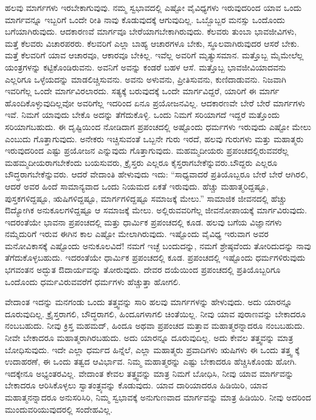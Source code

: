 ಹಲವು ಮಾರ್ಗಗಳು ಇರಬೇಕಾಗುವುವು. ನಮ್ಮ ಸ್ವಭಾವದಲ್ಲಿ ಎಷ್ಟೋ ವೈವಿಧ್ಯಗಳು ಇರುವುದರಿಂದ ಯಾವ ಒಂದು ಮಾರ್ಗವನ್ನೂ ಇಬ್ಬರಿಗೆ ಒಂದೇ ರೀತಿ ನಾವು ಕೊಡುವುದಕ್ಕೆ ಆಗುವುದಿಲ್ಲ. ಒಬ್ಬೊಬ್ಬರ ಮನಸ್ಸು ಒಂದೊಂದು ಬಗೆಯಾಗಿರುವುದು. ಆದಕಾರಣವೆ ಮಾರ್ಗವೂ ಬೇರೆಯಾಗಬೇಕಾಗಿರುವುದು. ಕೆಲವರು ತುಂಬಾ ಭಾವಜೀವಿಗಳು, ಮತ್ತೆ ಕೆಲವರು ವಿಚಾರಪರರು. ಕೆಲವರಿಗೆ ಎಲ್ಲಾ ಬಾಹ್ಯ ಆಚಾರಗಳೂ ಬೇಕು, ಸ್ಥೂಲವಾಗಿರುವುದರ ಆಸರೆ ಬೇಕು. ಮತ್ತೆ ಕೆಲವರಿಗೆ ಯಾವ ಆಚಾರವೂ, ಆಕಾರವೂ ಬೇಕಿಲ್ಲ. ಇವೆಲ್ಲ ಅವರಿಗೆ ಮೃತ್ಯುಸಮಾನ. ಮತ್ತೊಬ್ಬ ಮೈಮೇಲೆಲ್ಲ ಯಂತ್ರಗಳನ್ನು ಕಟ್ಟಿಕೊಂಡಿರುವನು. ಅವನಿಗೆ ಅವನ್ನು ಕಂಡರೆ ಬಹಳ ಆಸೆ. ಮತ್ತೊಬ್ಬ ಭಾವಜೀವಿಯಾದವನು ಎಲ್ಲರಿಗೂ ಒಳ್ಳೆಯದನ್ನು ಮಾಡಲಿಚ್ಚಿಸುವನು. ಅವನು ಅಳುವನು, ಪ್ರೀತಿಸುವನು, ಕುಣಿದಾಡುವನು. ನಿಜವಾಗಿ ಇವರಿಗೆಲ್ಲ ಒಂದೇ ಮಾರ್ಗವಿರಲಾರದು. ಸತ್ಯಕ್ಕೆ ಬರುವುದಕ್ಕೆ ಒಂದೇ ಮಾರ್ಗವಿದ್ದರೆ, ಯಾರಿಗೆ ಈ ಮಾರ್ಗ ಹೊಂದಿಕೊಳ್ಳುವುದಿಲ್ಲವೋ ಅವರಿಗೆಲ್ಲ ಇದರಿಂದ ಏನೂ ಪ್ರಯೋಜನವಿಲ್ಲ. ಆದಕಾರಣವೇ ಬೇರೆ ಬೇರೆ ಮಾರ್ಗಗಳು ಇವೆ. ನಿಮಗೆ ಯಾವುದು ಬೇಕೊ ಅದನ್ನು ತೆಗೆದುಕೊಳ್ಳಿ. ಒಂದು ನಿಮಗೆ ಸರಿಯಾಗದೆ ಇದ್ದರೆ ಮತ್ತೊಂದು ಸರಿಯಾಗಬಹುದು. ಈ ದೃಷ್ಟಿಯಿಂದ ನೋಡಿದಾಗ ಪ್ರಪಂಚದಲ್ಲಿ ಅಷ್ಟೊಂದು ಧರ್ಮಗಳು ಇರುವುದು ಎಷ್ಟೋ ಮೇಲು ಎಂಬುದು ಗೊತ್ತಾಗುವುದು. ಅನೇಕರು ಇಚ್ಚಿಸುವಂತೆ ಒಬ್ಬನೇ ಗುರು ಇರದೆ, ಹಲವು ಗುರುಗಳು ಮತ್ತು ಮಹಾತ್ಮರು ಇರುವುದರಿಂದ ಎಷ್ಟು ಪ್ರಯೋಜನ ಎನ್ನುವುದು ಗೊತ್ತಾಗುವುದು. ಮಹಮ್ಮದೀಯರು ಪ್ರಪಂಚದಲ್ಲಿರುವವರೆಲ್ಲ ಮಹಮ್ಮದೀಯರಾಗಬೇಕೆಂದು ಬಯಸುವರು, ಕ್ರೈಸ್ತರು ಎಲ್ಲರೂ ಕೈಸ್ತರಾಗಬೇಕೆನ್ನುವರು.\break ಬೌದ್ದರು ಎಲ್ಲರೂ ಬೌದ್ಧರಾಗಬೇಕೆನ್ನುವರು. ಆದರೆ ವೇದಾಂತಿ ಹೇಳುವುದು ಇದು: “ಸಾಧ್ಯವಾದರೆ ಪ್ರತಿಯೊಬ್ಬರೂ ಬೇರೆ ಬೇರೆ ಆಗಿರಲಿ, ಆದರೆ ಅವರ ಹಿಂದೆ ಸಾಮಾನ್ಯವಾದ ಒಂದು ನಿಯಮದ ಏಕತೆ ಇರುವುದು. ಹೆಚ್ಚು ಮಹಾತ್ಮರಿದ್ದಷ್ಟೂ, ಪುಸ್ತಕಗಳಿದ್ದಷ್ಟೂ, ಋಷಿಗಳಿದ್ದಷ್ಟೂ, ಮಾರ್ಗಗಳಿದ್ದಷ್ಟೂ ಸಮಾಜಕ್ಕೆ ಮೇಲು.” ಸಾಮಾಜಿಕ ಜೀವನದಲ್ಲಿ ಹೆಚ್ಚು ಔದ್ಯೋಗಿಕ ಅನುಕೂಲಗಳಿದ್ದಷ್ಟೂ ಆ ಸಮಾಜಕ್ಕೆ ಮೇಲು. ಅಲ್ಲಿರುವವರಿಗೆಲ್ಲ ಜೀವನೋಪಾಯಕ್ಕೆ ಮಾರ್ಗವಿರುವುದು. ಇದರಂತೆಯೇ ಭಾವನಾ ಪ್ರಪಂಚದಲ್ಲಿ ಮತ್ತು ಧಾರ್ಮಿಕ ಪ್ರಪಂಚದಲ್ಲಿ ಕೂಡ. ಹಲವು ಬಗೆಯ ವಿಜ್ಞಾನಗಳು ನಮ್ಮೆದುರಿಗೆ ಇರುವ ಈಗಿನ ಕಾಲ ಎಷ್ಟೋ ಮೇಲಾಗಿರುವುದು. ಇಷ್ಟೊಂದು ವೈವಿಧ್ಯ ಇರುವಾಗ ಅವರ ಮನೋವಿಕಾಸಕ್ಕೆ ಎಷ್ಟೊಂದು ಅನುಕೂಲವಿದೆ! ನಮಗೆ ಇಚ್ಛೆ ಬಂದುದನ್ನು, ನಮಗೆ ಶ್ರೇಷ್ಠವೆಂದು ತೋರಿದುದನ್ನು ನಾವು ತೆಗೆದುಕೊಳ್ಳಬಹುದು. ಇದರಂತೆಯೇ ಧಾರ್ಮಿಕ ಪ್ರಪಂಚದಲ್ಲಿ ಕೂಡ. ಪ್ರಪಂಚದಲ್ಲಿ ಇಷ್ಟೊಂದು ಧರ್ಮಗಳಿರುವುದು ಭಗವಂತನ ಅದ್ಭುತ ಔದಾರ್ಯವನ್ನು ತೋರುವುದು. ದೇವರ ದಯೆಯಿಂದ ಪ್ರಪಂಚದಲ್ಲಿ ಪ್ರತಿಯೊಬ್ಬರಿಗೂ ಒಂದೊಂದು ಧರ್ಮವಿರುವವರೆಗೆ ಧರ್ಮಗಳು ಹೆಚ್ಚುತ್ತಾ ಹೋಗಲಿ.

ವೇದಾಂತ ಇದನ್ನು ಮನಗಂಡು ಒಂದು ತತ್ತ್ವವನ್ನು ಸಾರಿ ಹಲವು ಮಾರ್ಗಗಳನ್ನು ಹೇಳುವುದು. ಅದು ಯಾರನ್ನೂ ದೂರುವುದಿಲ್ಲ. ಕ್ರೈಸ್ತರಾಗಲಿ, ಬೌದ್ಧರಾಗಲಿ, ಹಿಂದೂಗಳಾಗಲಿ ಚಿಂತೆಯಿಲ್ಲ. ನೀವು ಯಾವ ಪುರಾಣವನ್ನು ಬೇಕಾದರೂ ನಂಬಬಹುದು. ನೀವು ಕ್ರಿಸ್ತ ಮಹಮದ್, ಹಿಂದೂ ಅಥವಾ ಪ್ರಪಂಚದ ಮತ್ತಾವ ಮಹಾತ್ಮರನ್ನಾದರೂ ನಂಬಬಹುದು. ನೀವೇ ಬೇಕಾದರೂ ಮಹಾತ್ಮರಾಗಿರಬಹುದು. ಅದು ಯಾರನ್ನೂ ದೂರುವುದಿಲ್ಲ. ಅದು ಕೇವಲ ತತ್ತ್ವವನ್ನು ಮಾತ್ರ ಬೋಧಿಸುವುದು. ಇದೇ ಎಲ್ಲಾ ಧರ್ಮದ ಹಿನ್ನೆಲೆ, ಎಲ್ಲಾ ಮಹಾತ್ಮರು ಪ್ರವಾದಿಗಳು ಋಷಿಗಳು ಈ ಒಂದು ತತ್ತ್ವ ಕ್ಕೆ ಉದಾಹರಣೆ, ಈ ಒಂದು ತತ್ವದ ಆವಿರ್ಭಾವ. ನಿಮ್ಮ ಮಹಾತ್ಮರನ್ನು ಎಷ್ಟು ಬೇಕಾದರೂ ಹೆಚ್ಚಿಸಿಕೊಂಡು ಹೋಗಿ. ಇದಕ್ಕೇನೂ ಅಭ್ಯಂತರವಿಲ್ಲ. ವೇದಾಂತ ಕೇವಲ ತತ್ತ್ವವನ್ನು ಮಾತ್ರ ನಿಮಗೆ ಬೋಧಿಸಿ, ನೀವು ಯಾವ ಮಾರ್ಗವನ್ನು ಬೇಕಾದರೂ ಆರಿಸಿಕೊಳ್ಳಲು ಸ್ವಾತಂತ್ರ್ಯವನ್ನು ಕೊಡುವುದು. ಯಾವ ದಾರಿಯಾದರೂ ಹಿಡಿಯಿರಿ, ಯಾವ ಮಹಾತ್ಮನನ್ನಾದರೂ ಅನುಸರಿಸಿರಿ, ನಿಮ್ಮ ಸ್ವಭಾವಕ್ಕೆ ಅನುಗುಣವಾದ ಮಾರ್ಗವನ್ನು ಮಾತ್ರ ಹಿಡಿಯಿರಿ. ನೀವು ಅದರಿಂದ ಮುಂದುವರಿಯುವುದರಲ್ಲಿ ಸಂದೇಹವಿಲ್ಲ.

